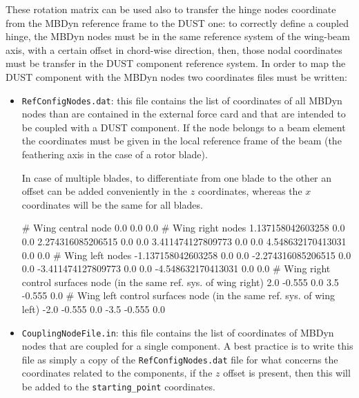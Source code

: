 These rotation matrix can be used also to transfer the hinge nodes coordinate from the MBDyn reference frame to the DUST one: to correctly define a coupled hinge, the MBDyn nodes must be in the same reference system of the wing-beam axis, with a certain offset in chord-wise direction, then, those nodal coordinates must be transfer in the DUST component reference system. 
In order to map the DUST component with the MBDyn nodes two coordinates files must be written: 
\begin{itemize}
    \item \texttt{RefConfigNodes.dat}: this file contains the list of coordinates of all MBDyn nodes than are contained in the external force card and that are intended to be coupled with a DUST component. If the node belongs to a beam element the coordinates must be given in the local reference frame of the beam (the feathering axis in the case of a rotor blade). 
    
    In case of multiple blades, to differentiate from one blade to the other an offset can be added conveniently in the $z$ coordinates, whereas the $x$ coordinates will be the same for all blades.  
    \begin{inputfile}[frame=single, caption={}, label={}]
      # Wing central node
      0.0  0.0    0.0 
      # Wing right nodes
      1.137158042603258  0.0    0.0 
      2.274316085206515  0.0    0.0 
      3.411474127809773  0.0    0.0 
      4.548632170413031  0.0    0.0 
      # Wing left nodes 
      -1.137158042603258  0.0    0.0 
      -2.274316085206515  0.0    0.0 
      -3.411474127809773  0.0    0.0 
      -4.548632170413031  0.0    0.0 
      # Wing right control surfaces node (in the same ref. sys. of wing right)
      2.0     -0.555  0.0
      3.5     -0.555  0.0
      # Wing left control surfaces node (in the same ref. sys. of wing left)
      -2.0     -0.555  0.0
      -3.5     -0.555  0.0
    \end{inputfile}
    \item \texttt{CouplingNodeFile.in}: this file contains the list of coordinates of MBDyn nodes that are coupled for a single component. A best practice is to write this file as simply a copy of the \texttt{RefConfigNodes.dat} file for what concerns the coordinates related to the components, if the $z$ offset is present, then this will be added to the \texttt{starting\_point} coordinates.  
    

\end{itemize}
